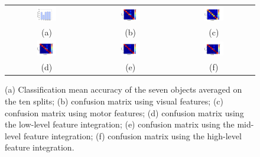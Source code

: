 \begin{figure} \centering
  \begin{tabular}{@{}c@{}@{}c@{}@{}c@{}}
    \includegraphics[width=0.25\textwidth]{images/ric_.pdf} &
    \includegraphics[width=0.25\textwidth]{images/conf_vis.pdf} &
    \includegraphics[width=0.25\textwidth]{images/conf_mot_ric.pdf} \\
(a) & (b) & (c)\\
    \includegraphics[width=0.25\textwidth]{images/conf_low_ric.pdf} &
\includegraphics[width=0.25\textwidth]{images/conf_mck_ric.pdf} &
\includegraphics[width=0.25\textwidth]{images/conf_das_ric.pdf} \\
    (d) & (e) & (f)\\
  \end{tabular}
  \caption{(a) Classification mean accuracy of the seven objects averaged
    on the ten splits; (b) confusion matrix using visual features; (c) confusion
    matrix using motor features; (d) confusion matrix using the low-level
    feature integration; (e) confusion matrix using the mid-level
    feature integration; (f) confusion matrix using the high-level
    feature integration.}
  \label{fig:rec_data}
\end{figure}


